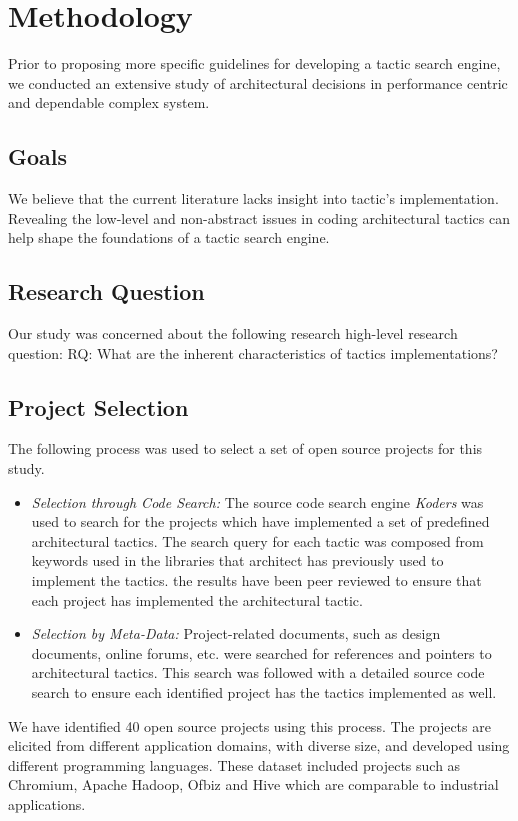  \section{Methodology}
\label{sec:Method}
Prior to proposing more specific guidelines for developing a tactic search engine, we conducted an extensive study of architectural decisions in performance centric and dependable complex system.

\subsection{Goals}
 We believe that the current literature lacks insight into tactic's implementation. Revealing the low-level and non-abstract issues in coding architectural tactics can help shape the foundations of a tactic search engine. 
 
 \subsection{Research Question}
Our study was concerned about the following research high-level research question:
RQ: What are the inherent characteristics of tactics implementations?

\subsection{Project Selection}
The following process was used to select a set of open source projects for this study.

\begin{itemize}
\item \textit{Selection through Code Search:} The source code search engine \textit{Koders} was used to search for the projects which have implemented a set of predefined architectural tactics. The search query for each tactic was composed from keywords used in  the libraries that architect has previously used to implement the tactics. the results have been peer reviewed to ensure that each project has implemented the architectural tactic.
\item \textit{Selection by Meta-Data:} Project-related documents, such as design documents, online forums, etc. were searched for references and pointers to architectural tactics. This search was followed with a detailed source code search to ensure each identified project has the tactics implemented as well.
\end{itemize}
We have identified 40 open source projects using this process. The projects are elicited from different application domains, with diverse size, and developed using different programming languages. These dataset included projects such as Chromium, Apache Hadoop, Ofbiz and Hive which are comparable to industrial applications.

